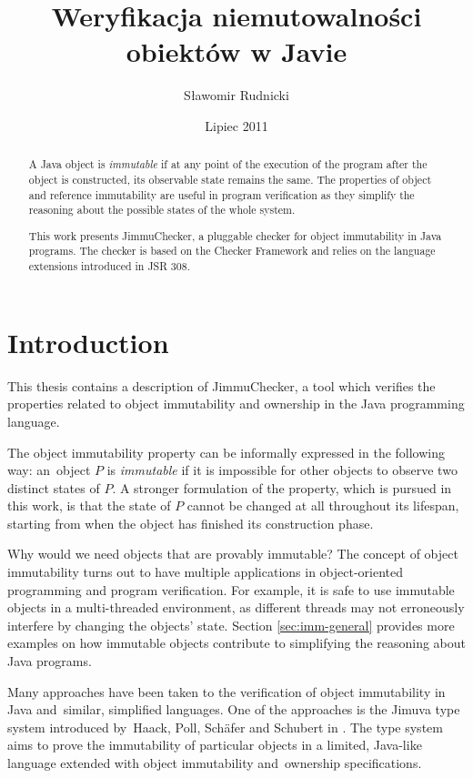 \documentclass{pracamgr}
\author{Sławomir Rudnicki}
\title{Weryfikacja niemutowalności obiektów w Javie}
\date{Lipiec 2011}
\theoremstyle{break}
\theoremstyle{break}
\theoremstyle{break}
\begin{document}
\maketitle

\begin{abstract}
  A Java object is \emph{immutable} if at any point of the execution
  of the program after the object is constructed, its observable state
  remains the same. The properties of object and reference
  immutability are useful in program verification as they simplify the
  reasoning about the possible states of the whole system. 

  This work presents JimmuChecker, a pluggable checker for object
  immutability in Java programs. The checker is based on the Checker
  Framework and relies on the language extensions introduced in
  JSR 308.
\end{abstract}

\tableofcontents

\chapter{Introduction}
\label{chap:intro}

This thesis contains a description of JimmuChecker, a tool which
verifies the properties related to object immutability and ownership
in the Java programming language.

The object immutability property can be informally expressed in the
following way: an~object $P$ is \emph{immutable} if it is impossible
for other objects to observe two distinct states of $P$. A stronger
formulation of the property, which is pursued in this work, is that
the state of $P$ cannot be changed at all throughout its lifespan,
starting from when the object has finished its construction phase.

Why would we need objects that are provably immutable? The concept of
object immutability turns out to have multiple applications in
object-oriented programming and program verification. For example, it
is safe to use immutable objects in a multi-threaded environment, as
different threads may not erroneously interfere by changing the
objects' state. Section \ref{sec:imm-general} provides more examples
on how immutable objects contribute to simplifying the reasoning about
Java programs.

Many approaches have been taken to the verification of object
immutability in Java and~similar, simplified languages. One of the
approaches is the Jimuva type system introduced by~Haack, Poll,
Schäfer and Schubert in \cite{haack}. The type system aims to prove
the im\-mu\-ta\-bi\-li\-ty of particular objects in a limited,
Java-like language extended with object immutability and~ownership
specifications.
\end{document}
